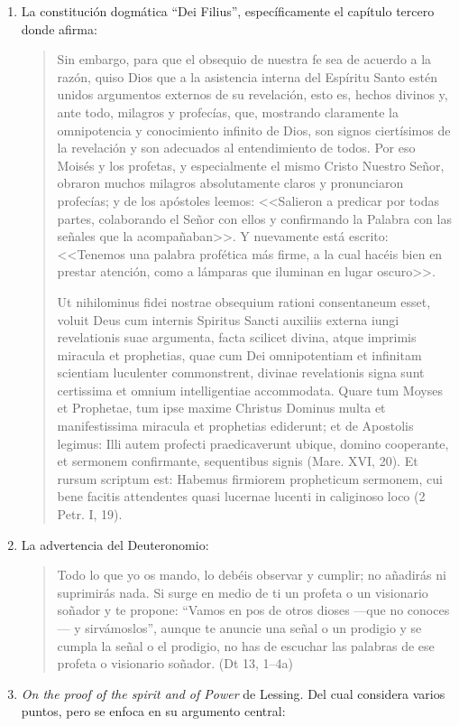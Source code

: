 \begin{enumerate}
\item La constitución dogmática \enquote{Dei Filius}, específicamente el
  capítulo tercero donde afirma: \blockquote[Ut nihilominus fidei nostrae
  obsequium rationi consentaneum esset, voluit Deus cum internis Spiritus Sancti
  auxiliis externa iungi revelationis suae argumenta, facta scilicet divina,
  atque imprimis miracula et prophetias, quae cum Dei omnipotentiam et
  infinitam scientiam luculenter commonstrent, divinae revelationis signa sunt
  certissima et omnium intelligentiae accommodata. Quare tum Moyses et
  Prophetae, tum ipse maxime Christus Dominus multa et manifestissima miracula
  et prophetias ediderunt; et de Apostolis legimus: Illi autem profecti
  praedicaverunt ubique, domino cooperante, et sermonem confirmante, sequentibus
  signis (Mare. XVI, 20). Et rursum scriptum est: Habemus firmiorem propheticum
  sermonem, cui bene facitis attendentes quasi lucernae lucenti in caliginoso
  loco (2 Petr. I, 19).]{Sin embargo, para que el obsequio de nuestra fe sea de
    acuerdo a la razón, quiso Dios que a la asistencia interna del Espíritu
    Santo estén unidos argumentos externos de su revelación, esto es, hechos
    divinos y, ante todo, milagros y profecías, que, mostrando claramente la
    omnipotencia y conocimiento infinito de Dios, son signos ciertísimos de la
    revelación y son adecuados al entendimiento de todos. Por eso Moisés y los
    profetas, y especialmente el mismo Cristo Nuestro Señor, obraron muchos
    milagros absolutamente claros y pronunciaron profecías; y de los apóstoles
    leemos: <<Salieron a predicar por todas partes, colaborando el Señor con
    ellos y confirmando la Palabra con las señales que la acompañaban>>. Y
    nuevamente está escrito: <<Tenemos una palabra profética más firme, a la
    cual hacéis bien en prestar atención, como a lámparas que iluminan en lugar
    oscuro>>.}
\item La advertencia del Deuteronomio: \blockquote{Todo lo que yo os mando, lo
    debéis observar y cumplir; no añadirás ni suprimirás nada. Si surge en medio
    de ti un profeta o un visionario soñador y te propone: \enquote{Vamos en pos
      de otros dioses ---que no conoces--- y sirvámoslos}, aunque te anuncie una
    señal o un prodigio y se cumpla la señal o el prodigio, no has de escuchar
    las palabras de ese profeta o visionario soñador. (Dt 13, 1--4a)}
\item \emph{On the proof of the spirit and of Power} de Lessing. Del cual
  considera varios puntos, pero se enfoca en su argumento central:

\end{enumerate}
